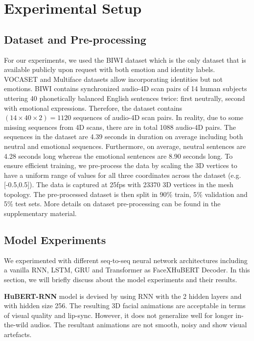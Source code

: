 \documentclass[10pt,twocolumn,letterpaper]{article}
\begin{document}
\section{Experimental Setup}

\subsection{Dataset and Pre-processing}
For our experiments, we used the BIWI\cite{eth_biwi_00760} dataset which is the only dataset that is available publicly upon request with both emotion and identity labels. VOCASET\cite{VOCASET} and Multiface\cite{multiface} datasets allow incorporating identities but not emotions. BIWI contains synchronized audio-4D scan pairs of 14 human subjects uttering 40 phonetically balanced English sentences twice: first neutrally, second with emotional expressions. Therefore, the dataset contains $(14\times40\times2)=1120$ sequences of audio-4D scan pairs. In reality, due to some missing sequences from 4D scans, there are in total 1088 audio-4D pairs. The sequences in the dataset are 4.39 seconds in duration on average including both neutral and emotional sequences. Furthermore, on average, neutral sentences are 4.28 seconds long whereas the emotional sentences are 8.90 seconds long. To ensure efficient training, we pre-process the data by scaling the 3D vertices to have a uniform range of values for all three coordinates across the dataset (e.g. [-0.5,0.5]). The data is captured at 25fps with 23370 3D vertices in the mesh topology. The pre-processed dataset is then split in 90\% train, 5\% validation and 5\% test sets. More details on dataset pre-processing can be found in the supplementary material. 


\subsection{Model Experiments}
\label{sec:experiments}
We experimented with different seq-to-seq neural network architectures including a vanilla RNN, LSTM, GRU and Transformer as FaceXHuBERT Decoder. In this section, we will briefly discuss about the model experiments and their results. 


\noindent\textbf{HuBERT-RNN} model is devised by using RNN with the 2 hidden layers and with hidden size 256. The resulting 3D facial animations are acceptable in terms of visual quality and lip-sync. However, it does not generalize well for longer in-the-wild audios. The resultant animations are not smooth, noisy and show visual artefacts. 
\end{document}
